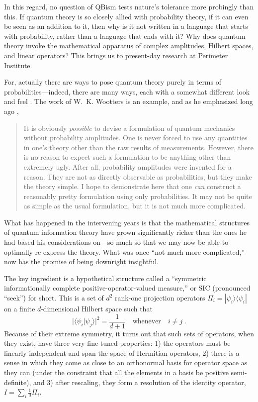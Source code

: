 In this regard, no question of QBism tests nature's tolerance more probingly than this.  If quantum theory is so closely allied with probability theory, if it can even be seen as an addition to it, then why is it not written in a language that starts with probability, rather than a language that ends with it?  Why does quantum theory invoke the mathematical apparatus of complex amplitudes, Hilbert spaces, and linear operators?  This brings us to present-day research at Perimeter Institute.

For, actually there are ways to pose quantum theory purely in terms of probabilities---indeed, there are many ways, each with a somewhat different look and feel \cite{Ferrie09}.  The work of W.~K. Wootters is an example, and as he emphasized long ago \cite{Wootters86},
\begin{quotation}\small
It is obviously {\it possible\/} to devise a formulation of quantum mechanics
without probability amplitudes. One is never forced to use any quantities in
one's theory other than the raw results of measurements. However, there is
no reason to expect such a formulation to be anything other than
extremely ugly. After all, probability amplitudes were invented for a reason.
They are not as directly observable as probabilities, but they make the
theory simple. I hope to demonstrate here that one {\it can\/} construct a
reasonably pretty formulation using only probabilities. It may not be quite
as simple as the usual formulation, but it is not much more complicated.
\end{quotation}
What has happened in the intervening years is that the mathematical structures of quantum information theory have grown significantly richer than the ones he had based his considerations on---so much so that we may now be able to optimally re-express the theory.  What was once ``not much more complicated,'' now has the promise of being downright insightful.

The key ingredient is a hypothetical structure called a ``symmetric informationally complete positive-operator-valued measure,'' or SIC (pronounced ``seek'') for short.  This is a set of $d^2$ rank-one projection operators $\Pi_i=|\psi_i\rangle\langle\psi_i|$ on a finite $d$-dimensional Hilbert space such that
\begin{equation}
\big|\langle\psi_i|\psi_j\rangle\big|^2=\frac{1}{d+1}\quad \mbox{whenever} \quad i\ne j\;.
\label{Mojo}
\end{equation}
Because of their extreme symmetry, it turns out that such sets of operators, when they exist, have three very fine-tuned properties: 1) the operators must be linearly independent and span the space of Hermitian operators, 2) there is a sense in which they come as close to an orthonormal basis for operator space as they can (under the constraint that all the elements in a basis be positive semi-definite), and 3) after rescaling, they form a resolution of the identity operator, $I=\sum_i \frac{1}{d}\Pi_i$.

